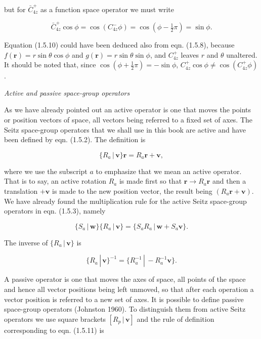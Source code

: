 \documentclass[11pt,a4paper,twoside,openright]{book}
\begin{document}
but for $\bar{C}_{4z}^{+}$ as a function space operator we must write

\begin{equation*}
\bar{C}_{4z}^{+}\cos\phi = \cos(C_{4z}^{-}\phi) = \cos(\phi - \tfrac{1}{2}\pi) = \sin\phi. \tag{1.5.10}
\end{equation*}

Equation (1.5.10) could have been deduced also from eqn. (1.5.8), because $f(\mathbf{r}) = r\sin\theta\cos\phi$ and $g(\mathbf{r}) = r\sin\theta\sin\phi$, and $C_{4z}^{+}$ leaves $r$ and $\theta$ unaltered. It should be noted that, since $\cos(\phi + \tfrac{1}{2}\pi) = -\sin\phi$, $C_{4z}^{+}\cos\phi \neq \cos(C_{4z}^{+}\phi)$.

\textit{Active and passive space-group operators}

As we have already pointed out an active operator is one that moves the points or position vectors of space, all vectors being referred to a fixed set of axes. The Seitz space-group operators that we shall use in this book are active and have been defined by eqn. (1.5.2). The definition is

\begin{equation*}
\{R_{a} \,|\, \mathbf{v}\}\mathbf{r} = R_{a}\mathbf{r} + \mathbf{v}, \tag{1.5.11}
\end{equation*}

where we use the subscript $a$ to emphasize that we mean an active operator. That is to say, an active rotation $R_{a}$ is made first so that $\mathbf{r} \rightarrow R_{a}\mathbf{r}$ and then a translation $+\mathbf{v}$ is made to the new position vector, the result being $(R_{a}\mathbf{r} + \mathbf{v})$. We have already found the multiplication rule for the active Seitz space-group operators in eqn. (1.5.3), namely

\begin{equation*}
\{S_{a} \,|\, \mathbf{w}\}\{R_{a} \,|\, \mathbf{v}\} = \{S_{a}R_{a} \,|\, \mathbf{w} + S_{a}\mathbf{v}\}. \tag{1.5.12}
\end{equation*}

The inverse of $\{R_{a} \,|\, \mathbf{v}\}$ is

\begin{equation*}
\{R_{a} \,|\, \mathbf{v}\}^{-1} = \{R_{a}^{-1} \,|\, -R_{a}^{-1}\mathbf{v}\}. \tag{1.5.13}
\end{equation*}

A passive operator is one that moves the axes of space, all points of the space and hence all vector positions being left unmoved, so that after each operation a vector position is referred to a new set of axes. It is possible to define passive space-group operators (Johnston 1960). To distinguish them from active Seitz operators we use square brackets $[R_{p} \,|\, \mathbf{v}]$ and the rule of definition corresponding to eqn. (1.5.11) is
\end{document}
